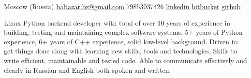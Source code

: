 \documentclass[unicode, 10pt, a4paper, oneside, fleqn]{article}
\begin{document}
\sloppy  %


\nobreakvspace{0.3em}  %

Moscow (Russia)
\sbull
\href{mailto:baltazar.bz@gmail.com}{baltazar.bz\mbox{}@\mbox{}gmail.com}\sbull
\textsmaller{+}79853037426\sbull
\href{http://ru.linkedin.com/pub/yuri-bochkarev/21/3a9/555}{linkedin}
\sbull
\href{https://bitbucket.org/balta2ar}{bitbucket}
\sbull
\href{https://github.com/balta2ar}{github}



\noindent
Linux Python backend developer with total of over 10 years of experience in
    building, testing and maintaining complex software systems. 5+ years of
    Python experience, 6+ years of C++ experience, solid low-level background.
    Driven to get things done along with learning new skills, tools and
    technologies.  Skills to write efficient, maintainable and tested code. Able
    to communicate effectively and clearly in Russian and English both spoken
    and written.

\end{document}
